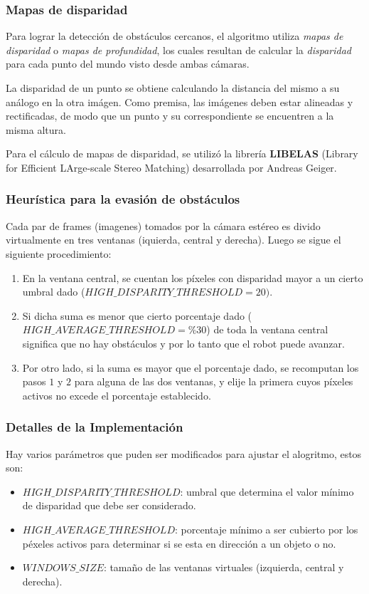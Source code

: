 \documentclass[svgnames]{beamer}
\begin{document}
\begin{frame}
\frametitle{Mapas de disparidad}

Para lograr la detecci\'on de obst\'aculos cercanos, el algoritmo utiliza \emph{mapas de disparidad} o \emph{mapas de profundidad}, los cuales resultan de calcular la \emph{disparidad} para cada punto del mundo visto desde ambas c\'amaras.

\medskip
La disparidad de un punto se obtiene calculando la distancia del mismo a su an\'alogo en la otra im\'agen. Como premisa, las im\'agenes deben estar alineadas y rectificadas, de modo que un punto y su correspondiente se encuentren a la misma altura.

\medskip
Para el c\'alculo de mapas de disparidad, se utiliz\'o la librer\'ia {\bf LIBELAS} (Library for Efficient LArge-scale Stereo Matching) desarrollada por Andreas Geiger.

\end{frame}

\begin{frame}
\frametitle{Heur\'istica para la evasi\'on de obst\'aculos}
Cada par de frames (imagenes) tomados por la c\'amara est\'ereo es divido virtualmente en tres ventanas (iquierda, central y derecha).
Luego se sigue el siguiente procedimiento:

\begin{enumerate}
	\item En la ventana central, se cuentan los p\'ixeles con disparidad mayor a un cierto umbral dado ($HIGH\_DISPARITY\_THRESHOLD = 20)$.
	\item Si dicha suma es menor que cierto porcentaje dado ($HIGH\_AVERAGE\_THRESHOLD = \% 30$) de toda la ventana central significa que no hay obst\'aculos y por lo tanto que el robot puede avanzar.
	\item Por otro lado, si la suma es mayor que el porcentaje dado, se recomputan los pasos $1$ y $2$ para alguna de las dos ventanas, y elije la primera cuyos p\'ixeles activos no excede el porcentaje establecido.
\end{enumerate}

\end{frame}

\begin{frame}
\frametitle{Detalles de la Implementaci\'on}
Hay varios par\'ametros que puden ser modificados para ajustar el alogritmo, estos son:
\begin{itemize}
	\item $HIGH\_DISPARITY\_THRESHOLD$: umbral que determina el valor m\'inimo de disparidad que debe ser considerado. 
	\item $HIGH\_AVERAGE\_THRESHOLD$: porcentaje m\'inimo a ser cubierto por los p\'exeles activos para determinar si se esta en direcci\'on a un objeto o no.
	\item $WINDOWS\_SIZE$: tama\~no de las ventanas virtuales (izquierda, central y derecha).
\end{itemize} 

\end{frame}
\end{document}
